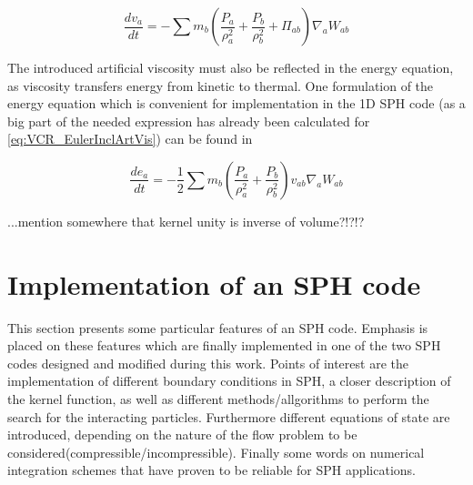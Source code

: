 \documentclass{report}
\begin{document}
\begin{equation}
\label{eq:VCR_EulerInclArtVis}
\frac{dv_{a}}{\mathit{dt}}=-\sum {m_{b}\left(\frac{P_{a}}{\rho_{a}^{2}}+\frac{P_{b}}{\rho _{b}^{2}}+\Pi _{ab}\right)\nabla_{a}W_{ab}}
\end{equation}

The introduced artificial viscosity must also be reflected in the energy equation, as viscosity transfers energy from kinetic to thermal\cite{Monaghan2005}. One formulation of the energy equation which is convenient for implementation in the 1D SPH code (as a big part of the needed expression has already been calculated for \ref{eq:VCR_EulerInclArtVis}) can be found in\cite{Liu2003}

\begin{equation}
\label{eq:ECR_EulerInclArtVis}
\frac{de_{a}}{\mathit{dt}}=-\mathit{}\frac{1}{2}\sum{m_{b}\left(\frac{P_{a}}{\rho _{a}^{2}}+\frac{P_{b}}{\rho _{b}^{2}}\right)v_{\mathit{ab}}\nabla _{a}W_{\mathit{ab}}}
\end{equation}

...mention somewhere that kernel unity is inverse of volume?!?!?

\section{Implementation of an SPH code}
This section presents some particular features of an SPH code. Emphasis is
placed on these features which are finally implemented in one of the
two SPH codes designed and modified during this work.
Points of interest are the implementation of different boundary conditions in
SPH, a closer description of the kernel function, as well as different methods/allgorithms
to perform the search for the interacting particles. Furthermore different
equations of state are introduced, depending on the nature of the flow problem
to be considered(compressible/incompressible). Finally some words on numerical
integration schemes that have proven to be reliable for SPH applications.
\end{document}
